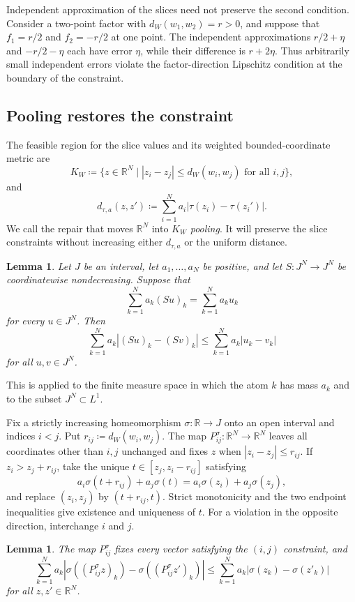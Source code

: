 \documentclass[10pt,a4paper]{amsart}
\newtheorem{lemma}[theorem]{Lemma}
\newcommand{\R}{\mathbb R}
\begin{document}
Independent approximation of the slices need not preserve the second condition. Consider a two-point factor with $d_W(w_1,w_2)=r>0$, and suppose that $f_1=r/2$ and $f_2=-r/2$ at one point. The independent approximations $r/2+\eta$ and $-r/2-\eta$ each have error $\eta$, while their difference is $r+2\eta$. Thus arbitrarily small independent errors violate the factor-direction Lipschitz condition at the boundary of the constraint.

\subsection{Pooling restores the constraint}
\label{subsec:pooling}

The feasible region for the slice values and its weighted bounded-coordinate metric are
\[
K_W\coloneqq\{z\in\R^N\mid |z_i-z_j|\leq d_W(w_i,w_j)\text{ for all }i,j\},
\]
and
\[
d_{\tau,a}(z,z')\coloneqq\sum_{i=1}^Na_i|\tau(z_i)-\tau(z_i')|.
\]
We call the repair that moves $\R^N$ into $K_W$ \emph{pooling}. It will preserve the slice constraints without increasing either $d_{\tau,a}$ or the uniform distance.

\begin{lemma}
\label{lem:order-mass-contraction}
Let $J$ be an interval, let $a_1,\ldots,a_N$ be positive, and let $S\colon J^N\to J^N$ be coordinatewise nondecreasing. Suppose that
\[
\sum_{k=1}^Na_k(Su)_k=\sum_{k=1}^Na_ku_k
\]
for every $u\in J^N$. Then
\[
\sum_{k=1}^Na_k|(Su)_k-(Sv)_k|\leq\sum_{k=1}^Na_k|u_k-v_k|
\]
for all $u,v\in J^N$.
\end{lemma}

This is \cite[Proposition~1, p.~385]{crandall-tartar1980nonexpansiveorder} applied to the finite measure space in which the atom $k$ has mass $a_k$ and to the subset $J^N\subset L^1$.

Fix a strictly increasing homeomorphism $\sigma\colon\R\to J$ onto an open interval and indices $i<j$. Put $r_{ij}\coloneqq d_W(w_i,w_j)$. The map $P_{ij}^\sigma\colon\R^N\to\R^N$ leaves all coordinates other than $i,j$ unchanged and fixes $z$ when $|z_i-z_j|\leq r_{ij}$. If $z_i>z_j+r_{ij}$, take the unique $t\in[z_j,z_i-r_{ij}]$ satisfying
\[
a_i\sigma(t+r_{ij})+a_j\sigma(t)=a_i\sigma(z_i)+a_j\sigma(z_j),
\]
and replace $(z_i,z_j)$ by $(t+r_{ij},t)$. Strict monotonicity and the two endpoint inequalities give existence and uniqueness of $t$. For a violation in the opposite direction, interchange $i$ and $j$.

\begin{lemma}
\label{lem:pairwise-pooling}
The map $P_{ij}^\sigma$ fixes every vector satisfying the $(i,j)$ constraint, and
\[
\sum_{k=1}^Na_k|\sigma((P_{ij}^\sigma z)_k)-\sigma((P_{ij}^\sigma z')_k)|\leq\sum_{k=1}^Na_k|\sigma(z_k)-\sigma(z'_k)|
\]
for all $z,z'\in\R^N$.
\end{lemma}
\end{document}
